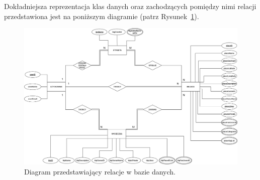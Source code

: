 		\noindent Dokładniejsza reprezentacja klas danych oraz zachodzących pomiędzy nimi relacji przedstawiona jest na poniższym diagramie (patrz Rysunek~\ref{relations}).

		\vspace{1cm}
        \begin{figure}[!ht]%
            \centering
            \includegraphics[scale=0.34]{src/relations_diagram.png}
            \caption{Diagram przedstawiający relacje w bazie danych.\label{relations}}
            \qquad
        \end{figure} 
